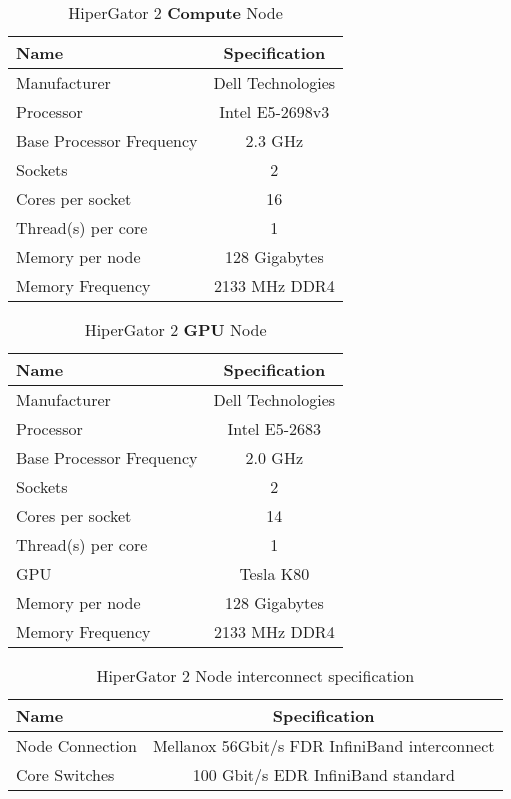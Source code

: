 \begin{table}[h]
  \centering
  \caption{HiperGator 2 \textbf{Compute} Node}
  \begin{tabular}{l c}
    \hline
    Name                       & Specification     \\
    \hline
    Manufacturer               & Dell Technologies \\
    Processor                  & Intel E5-2698v3   \\
    Base Processor Frequency   & 2.3 GHz           \\
    Sockets                    & 2                 \\
    Cores per socket           & 16                \\
    Thread(s) per core         & 1                 \\
    Memory per node            & 128 Gigabytes     \\
    Memory Frequency           & 2133 MHz DDR4     \\
    \hline
  \end{tabular}
  \label{tab:hpgcomputespecs}
\end{table}

\begin{table}[h]
  \centering
  \caption{HiperGator 2 \textbf{GPU} Node}
  \begin{tabular}{l c}
    \hline
    Name                       & Specification     \\
    \hline
    Manufacturer               & Dell Technologies \\
    Processor                  & Intel E5-2683     \\
    Base Processor Frequency   & 2.0 GHz           \\
    Sockets                    & 2                 \\
    Cores per socket           & 14                \\
    Thread(s) per core         & 1                 \\
    GPU                        & Tesla K80         \\
    Memory per node            & 128 Gigabytes     \\
    Memory Frequency           & 2133 MHz DDR4     \\
    \hline
  \end{tabular}
  \label{tab:hpggpuspecs}
\end{table}

\begin{table}[h]
  \centering
  \caption{HiperGator 2 Node interconnect specification}
  \begin{tabular}{l c}
    \hline
    Name             & Specification                                 \\
    \hline
    Node Connection  & Mellanox 56Gbit/s FDR InfiniBand interconnect \\
    Core Switches    & 100 Gbit/s EDR InfiniBand standard            \\
    \hline
  \end{tabular}
  \label{tab:hpgconnectspecs}
\end{table}


